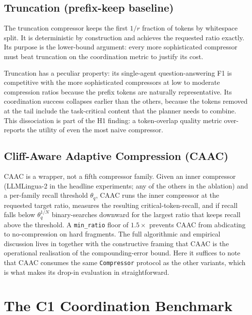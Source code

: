 \subsection{Truncation (prefix-keep baseline)}

The truncation compressor keeps the first $1/r$ fraction of tokens
by whitespace split. It is deterministic by construction and
achieves the requested ratio exactly. Its purpose is the
lower-bound argument: every more sophisticated compressor must
beat truncation on the coordination metric to justify its cost.

Truncation has a peculiar property: its single-agent
question-answering F1 is competitive with the more sophisticated
compressors at low to moderate compression ratios because the
prefix tokens are naturally representative. Its coordination
success collapses earlier than the others, because the tokens
removed at the tail include the task-critical content that the
planner needs to combine. This dissociation is part of the H1
finding: a token-overlap quality metric over-reports the utility
of even the most naive compressor.

\subsection{Cliff-Aware Adaptive Compression (CAAC)}
\label{sec:compressors_caac}

CAAC is a wrapper, not a fifth compressor family. Given an inner
compressor (LLMLingua-2 in the headline experiments; any of the
others in the ablation) and a per-family recall threshold
$\theta_q$, CAAC runs the inner compressor at the requested target
ratio, measures the resulting critical-token-recall, and if recall
falls below $\theta_q^{1/N}$ binary-searches downward for the
largest ratio that keeps recall above the threshold. A
\texttt{min\_ratio} floor of $1.5\times$ prevents CAAC from
abdicating to no-compression on hard fragments. The full
algorithmic and empirical discussion lives in
 together with the constructive framing
that CAAC is the operational realisation of the compounding-error
bound. Here it suffices to note that CAAC consumes the same
\texttt{Compressor} protocol as the other variants, which is what
makes its drop-in evaluation in 
straightforward.

\section{The C1 Coordination Benchmark}
\label{sec:c1}


